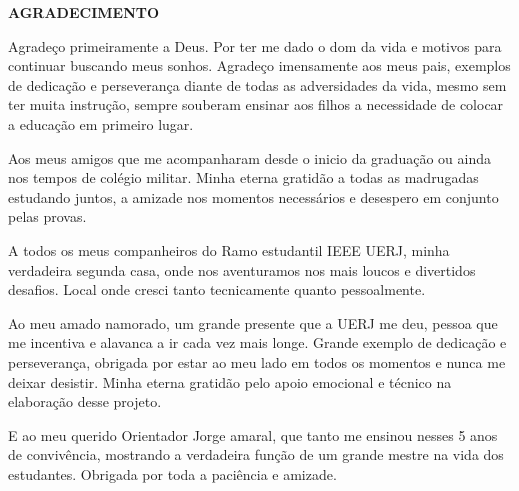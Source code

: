 \begin{center}
\textbf{AGRADECIMENTO}
\end{center}

$\!$\\

Agradeço primeiramente a Deus. Por ter me dado o dom da vida e motivos para continuar buscando meus sonhos. 
Agradeço imensamente aos meus pais, exemplos de dedicação e perseverança diante de todas as adversidades da vida, mesmo sem ter muita instrução, sempre souberam ensinar aos filhos a necessidade de colocar a educação em primeiro lugar. 

Aos meus amigos que me acompanharam desde o inicio da graduação ou ainda nos tempos de colégio militar. Minha eterna gratidão a todas as madrugadas estudando juntos, a amizade nos momentos necessários e desespero em conjunto pelas provas. 

A todos os meus companheiros do Ramo estudantil IEEE UERJ, minha verdadeira segunda casa, onde nos aventuramos nos mais loucos e divertidos desafios. Local onde cresci tanto tecnicamente quanto pessoalmente.  

Ao meu amado namorado, um grande presente que a UERJ me deu, pessoa que me incentiva e alavanca a ir cada vez mais longe. Grande exemplo de dedicação e perseverança, obrigada por estar ao meu lado em todos os momentos e nunca me deixar desistir. Minha eterna gratidão pelo apoio emocional e técnico na elaboração desse projeto. 

E ao meu querido Orientador Jorge amaral, que tanto me ensinou nesses 5 anos de convivência, mostrando a verdadeira função de um grande mestre na vida dos estudantes. Obrigada por toda a paciência e amizade. 

